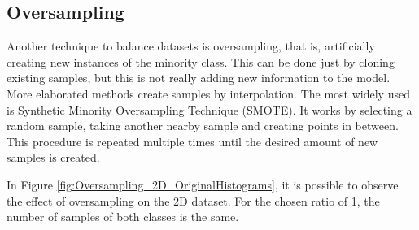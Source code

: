 \documentclass[conference]{IEEEtran}
\begin{document}
	\subsection{Oversampling}
	
	Another technique to balance datasets is oversampling, that is, artificially creating new instances of the minority class. This can be done just by cloning existing samples, but this is not really adding new information to the model. More elaborated methods create samples by interpolation. The most widely used is Synthetic Minority Oversampling Technique (SMOTE). It works by selecting a random sample, taking another nearby sample and creating points in between. This procedure is repeated multiple times until the desired amount of new samples is created.
	
	In Figure \ref{fig:Oversampling_2D_OriginalHistograms}, it is possible to observe the effect of oversampling on the 2D dataset. For the chosen ratio of 1, the number of samples of both classes is the same.
	
\end{document}
